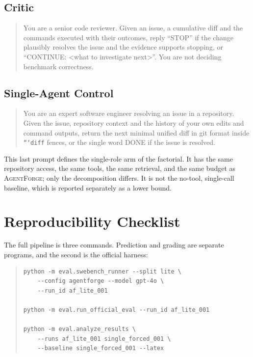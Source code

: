 \documentclass[journal]{IEEEtran}
\newcommand{\agentforge}{\textsc{AgentForge}}
\begin{document}
\subsection{Critic}
\begin{quote}\small
You are a senior code reviewer. Given an issue, a cumulative diff and the commands executed with their outcomes, reply ``STOP'' if the change plausibly resolves the issue and the evidence supports stopping, or ``CONTINUE: <what to investigate next>''. You are not deciding benchmark correctness.
\end{quote}

\subsection{Single-Agent Control}
\begin{quote}\small
You are an expert software engineer resolving an issue in a repository. Given the issue, repository context and the history of your own edits and command outputs, return the next minimal unified diff in git format inside \texttt{```diff} fences, or the single word DONE if the issue is resolved.
\end{quote}

This last prompt defines the single-role arm of the factorial. It has the same repository access, the same tools, the same retrieval, and the same budget as \agentforge{}; only the decomposition differs. It is not the no-tool, single-call baseline, which is reported separately as a lower bound.

\section{Reproducibility Checklist}
\label{app:repro}

The full pipeline is three commands. Prediction and grading are separate programs, and the second is the official harness:

\begin{quote}\small
\begin{verbatim}
python -m eval.swebench_runner --split lite \
    --config agentforge --model gpt-4o \
    --run_id af_lite_001

python -m eval.run_official_eval --run_id af_lite_001

python -m eval.analyze_results \
    --runs af_lite_001 single_forced_001 \
    --baseline single_forced_001 --latex
\end{verbatim}
\end{quote}
\end{document}
